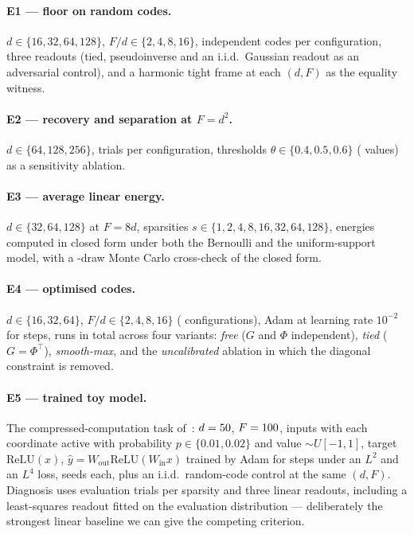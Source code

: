 \documentclass[preprint,12pt]{elsarticle}
\theoremstyle{definition}
\begin{document}
\paragraph{E1 --- floor on random codes.} $d\in\{16,32,64,128\}$, $F/d\in\{2,4,8,16\}$,
\EoneTrials{} independent codes per configuration, three readouts (tied, pseudoinverse and an
i.i.d.\ Gaussian readout as an adversarial control), and a harmonic tight frame at each
$(d,F)$ as the equality witness.

\paragraph{E2 --- recovery and separation at $F=d^2$.} $d\in\{64,128,256\}$,
\EtwoTrials{} trials per configuration, thresholds
$\theta\in\{0.4,0.5,0.6\}$ (\EtwoThetaCount{} values) as a sensitivity ablation.

\paragraph{E3 --- average linear energy.} $d\in\{32,64,128\}$ at $F=8d$, sparsities
$s\in\{1,2,4,8,16,32,64,128\}$, energies computed in closed form under both the Bernoulli and
the uniform-support model, with a \EthreeMcTrials-draw Monte Carlo cross-check of the closed
form.

\paragraph{E4 --- optimised codes.} $d\in\{16,32,64\}$, $F/d\in\{2,4,8,16\}$
(\EfourConfigs{} configurations), Adam at learning rate $10^{-2}$ for \EfourSteps{} steps,
\EfourRuns{} runs in total across four variants: \emph{free} ($G$ and $\Phi$ independent),
\emph{tied} ($G=\Phi^{\top}$), \emph{smooth-max}, and the \emph{uncalibrated} ablation in
which the diagonal constraint is removed.

\paragraph{E5 --- trained toy model.} The compressed-computation task
of~\cite{braun2025apd}: $d=50$, $F=100$, inputs with each coordinate active with
probability $p\in\{0.01,0.02\}$ and value $\sim U[-1,1]$, target $\mathrm{ReLU}(x)$,
$\hat y=W_{\mathrm{out}}\mathrm{ReLU}(W_{\mathrm{in}}x)$ trained by Adam for \EfiveSteps{} steps
under an $L^2$ and an $L^4$ loss, \EfiveSeeds{} seeds each, plus an i.i.d.\ random-code control
at the same $(d,F)$. Diagnosis uses \EfiveEvalTrials{} evaluation trials per sparsity and three
linear readouts, including a least-squares readout fitted on the evaluation distribution ---
deliberately the strongest linear baseline we can give the competing criterion.
\end{document}
